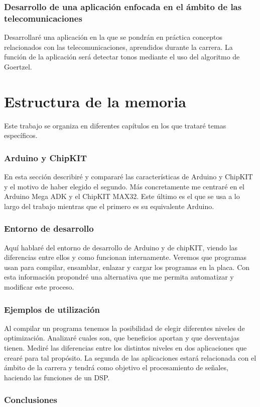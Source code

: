 \subsubsection{Desarrollo de una aplicación enfocada en el ámbito de las telecomunicaciones}
Desarrollaré una aplicación en la que se pondrán en práctica conceptos relacionados con las telecomunicaciones, aprendidos durante la carrera. La función de la aplicación será detectar tonos mediante el uso del algoritmo de Goertzel.

\section{Estructura de la memoria}
Este trabajo se organiza en diferentes capítulos en los que trataré temas específicos.

\subsubsection{Arduino y ChipKIT}
En esta sección describiré y compararé las características de Arduino y ChipKIT y el motivo de haber elegido el segundo. Más concretamente me centraré en el Arduino Mega ADK y el ChipKIT MAX32. Este último es el que se usa a lo largo del trabajo mientras que el primero es su equivalente Arduino.

\subsubsection{Entorno de desarrollo}
Aquí hablaré del entorno de desarrollo de Arduino y de chipKIT, viendo las diferencias entre ellos y como funcionan internamente. Veremos que programas usan para compilar, ensamblar, enlazar y cargar los programas en la placa. Con esta información propondré una alternativa que me permita automatizar y modificar este proceso.

\subsubsection{Ejemplos de utilización}
Al compilar un programa tenemos la posibilidad de elegir diferentes niveles de optimización. Analizaré cuales son, que beneficios aportan y que desventajas tienen. Mediré las diferencias entre los distintos niveles en dos aplicaciones que crearé para tal propósito. La segunda de las aplicaciones estará relacionada con el ámbito de la carrera y tendrá como objetivo el procesamiento de señales, haciendo las funciones de un DSP.

\subsubsection{Conclusiones}
